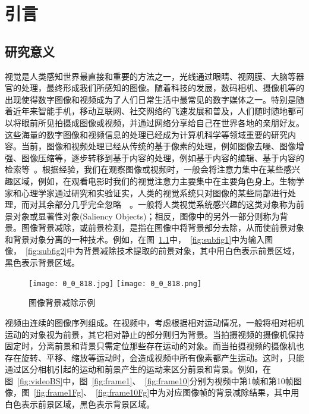 \chapter{引言}
\label{cha:intro}

\section{研究意义}
\label{sec:first}
视觉是人类感知世界最直接和重要的方法之一，光线通过眼睛、视网膜、大脑等器官的处理，最终形成我们所感知的图像。随着科技的发展，数码相机、摄像机等的出现使得数字图像和视频成为了人们日常生活中最常见的数字媒体之一。特别是随着近年来智能手机，移动互联网、社交网络的飞速发展和普及，人们随时随地都可以将眼前所见拍摄成图像或视频，并通过网络分享给自己在世界各地的亲朋好友。这些海量的数字图像和视频信息的处理已经成为计算机科学等领域重要的研究内容。当前，图像和视频处理已经从传统的基于像素的处理，例如图像去噪、图像增强、图像压缩等，逐步转移到基于内容的处理，例如基于内容的编辑、基于内容的检索等~\cite{CMM12THU}。根据经验，我们在观察图像或视频时，一般会将注意力集中在某些感兴趣区域，例如，在观看电影时我们的视觉注意力主要集中在主要角色身上。生物学家和心理学家通过研究和实验证实，人类的视觉系统只对图像的某些局部进行处理，而对其余部分几乎完全忽略~\cite{treisman1980a}~\cite{Koch1985Shifts}。一般将人类视觉系统感兴趣的这类对象称为前景对象或显著性对象(Saliency Objects)；相反，图像中的另外一部分则称为背景。图像背景减除，或前景检测，是指在图像中将背景部分去除，从而使前景对象和背景对象分离的一种技术。例如，在图~\ref{fig:1}中，~\ref{fig:subfig1}中为输入图像，~\ref{fig:subfig2}中为背景减除技术提取的前景对象，其中用白色表示前景区域，黑色表示背景区域。\par
\begin{figure}[h]
  \centering%
    {\texttt{[image: 0\_0\_818.jpg]}}%
 \hspace{1em}%
      {\texttt{[image: 0\_0\_818.png]}}
  \caption{图像背景减除示例}
  \label{fig:1}
\end{figure}
视频由连续的图像序列组成。在视频中，考虑根据相对运动情况，一般将相对相机运动的对象视为前景，其它相对静止的部分则归为背景。当拍摄视频的摄像机保持固定时，分离前景和背景只需定位那些存在运动的对象。而当拍摄视频的摄像机也存在旋转、平移、缩放等运动时，会造成视频中所有像素都产生运动。这时，只能通过区分相机引起的运动和前景产生的运动来区分前景和背景。例如，在图~\ref{fig:videoBS}中，图~\ref{fig:frame1}、~\ref{fig:frame10}分别为视频中第1帧和第10帧图像，图~\ref{fig:frame1Fg}、~\ref{fig:frame10Fg}中为对应图像帧的背景减除结果，其中用白色表示前景区域，黑色表示背景区域。
